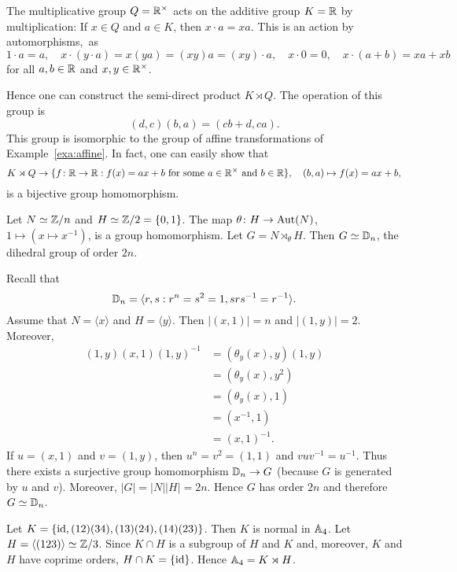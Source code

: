 \begin{example}
    The multiplicative group $Q=\mathbb{R}^{\times}$ acts on the 
    additive group $K=\mathbb{R}$ by multiplication: If $x\in Q$ and $a\in K$, 
    then $x\cdot a=xa$. This is an action by automorphisms,~as 
    \[
        1\cdot a=a,\quad 
        x\cdot (y\cdot a)=x(ya)=(xy)a=(xy)\cdot a,\quad 
        x\cdot 0=0,\quad 
        x\cdot (a+b)=xa+xb
    \]
    for all $a,b\in\mathbb{R}$ and $x,y\in\mathbb{R}^{\times}$. 
    
    Hence one can construct the semi-direct product $K\rtimes Q$. The operation of 
    this group is 
    \[ 
        (d,c)(b,a)=(cb+d,ca). 
    \]
    This group is isomorphic to the group of affine transformations of
    Example~\ref{exa:affine}. In fact, one can easily show that 
    \[ 
        K\rtimes Q\to \{f\colon\mathbb{R}\to\mathbb{R}:f(x)=ax+b\text{ for some $a\in\mathbb{R}^{\times}$ and $b\in\mathbb{R}$}\},
        \quad 
        (b,a)\mapsto f(x)=ax+b,
    \]
    is a bijective group homomorphism. 
\end{example}



\begin{example}
Let $N\simeq \mathbb{Z}/n$ and $H\simeq\mathbb{Z}/2=\{0,1\}$. The map $\theta\colon H\to\operatorname{Aut}(N)$, 
$1\mapsto (x\mapsto x^{-1})$, is a group homomorphism. Let $G=N\rtimes_\theta H$.
Then $G\simeq\mathbb{D}_n$, the dihedral group of order $2n$.

Recall that 
\[
\mathbb{D}_n=\langle r,s:r^n=s^2=1, srs^{-1}=r^{-1}\rangle.
\]
Assume that $N=\langle x\rangle$ and $H=\langle y\rangle$. Then $|(x,1)|=n$ and $|(1,y)|=2$. 
Moreover,
\begin{align*}
(1,y)(x,1)(1,y)^{-1} &= (\theta_y(x),y)(1,y)\\
&=(\theta_y(x),y^2)\\
&=(\theta_y(x),1)\\
&=(x^{-1},1)\\
&=(x,1)^{-1}.
\end{align*}
If $u=(x,1)$ and $v=(1,y)$, then $u^n=v^2=(1,1)$ and $vuv^{-1}=u^{-1}$. Thus there exists 
a surjective group homomorphism 
$\mathbb{D}_n\to G$ (because $G$ is generated by $u$ and $v$). Moreover, $|G|=|N||H|=2n$. Hence 
$G$ has order $2n$ and therefore $G\simeq\mathbb{D}_n$.
\end{example}

\begin{example}
Let $K=\{\operatorname{id},(12)(34),(13)(24),(14)(23)\}$. Then $K$ is normal in $\mathbb{A}_4$. 
Let $H=\langle (123)\rangle\simeq\mathbb{Z}/3$. Since $K\cap H$ is a subgroup of $H$ and $K$ and, moreover, 
$K$ and $H$ have coprime orders, $H\cap K=\{\operatorname{id}\}$. Hence $\mathbb{A}_4=K\rtimes H$.
\end{example}

